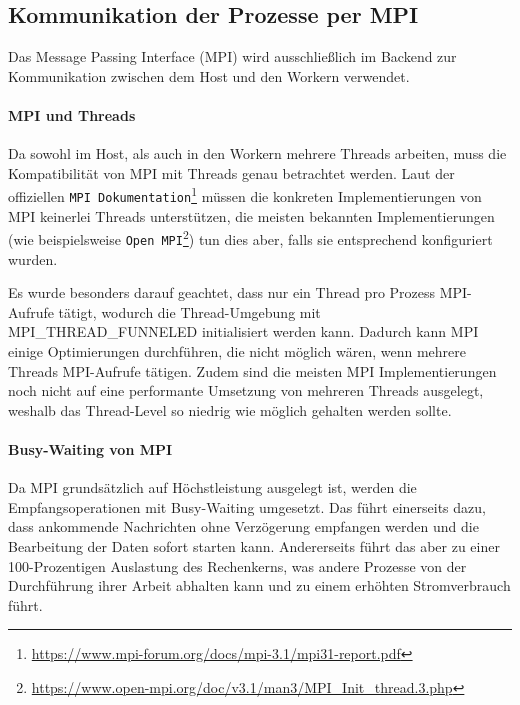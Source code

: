 \subsection{Kommunikation der Prozesse per MPI}\label{sec:mpi}


Das Message Passing Interface (MPI) wird ausschließlich im Backend zur Kommunikation zwischen dem Host und den Workern verwendet.

\paragraph{MPI und Threads}

Da sowohl im Host, als auch in den Workern mehrere Threads arbeiten, muss die Kompatibilität von MPI mit Threads genau betrachtet werden. Laut der offiziellen \verb|MPI Dokumentation|\footnote{\url{https://www.mpi-forum.org/docs/mpi-3.1/mpi31-report.pdf}} müssen die konkreten Implementierungen von MPI keinerlei Threads unterstützen, die meisten bekannten Implementierungen (wie beispielsweise \verb|Open MPI|\footnote{\url{https://www.open-mpi.org/doc/v3.1/man3/MPI_Init_thread.3.php}}) tun dies aber, falls sie entsprechend konfiguriert wurden.

Es wurde besonders darauf geachtet, dass nur ein Thread pro Prozess MPI-Aufrufe tätigt, wodurch die Thread-Umgebung mit MPI\_THREAD\_FUNNELED initialisiert werden kann. Dadurch kann MPI einige Optimierungen durchführen, die nicht möglich wären, wenn mehrere Threads MPI-Aufrufe tätigen. Zudem sind die meisten MPI Implementierungen noch nicht auf eine performante Umsetzung von mehreren Threads ausgelegt, weshalb das Thread-Level so niedrig wie möglich gehalten werden sollte.

\paragraph{Busy-Waiting von MPI}\label{para:mpi_busy_waiting}

Da MPI grundsätzlich auf Höchstleistung ausgelegt ist, werden die Empfangsoperationen mit Busy-Waiting umgesetzt. Das führt einerseits dazu, dass ankommende Nachrichten ohne Verzögerung empfangen werden und die Bearbeitung der Daten sofort starten kann. Andererseits führt das aber zu einer 100-Prozentigen Auslastung des Rechenkerns, was andere Prozesse von der Durchführung ihrer Arbeit abhalten kann und zu einem erhöhten Stromverbrauch führt.

